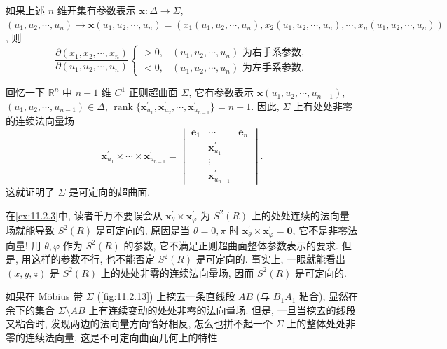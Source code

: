 如果上述 $n$ 维开集有参数表示 $\boldsymbol{x}: \Delta \to \Sigma$, $\left(u_{1}, u_{2}, \cdots, u_{n}\right) \to \boldsymbol{x}\left(u_{1}, u_{2}, \cdots, u_{n}\right)=\left(x_{1}\left(u_{1}, u_{2}, \cdots, u_{n}\right), x_{2}\left(u_{1}, u_{2}, \cdots, u_{n}\right), \cdots, x_{n}\left(u_{1}, u_{2}, \cdots, u_{n}\right)\right)$, 则
\[
  \frac{\partial\left(x_{1}, x_{2}, \cdots, x_{n}\right)}{\partial\left(u_{1}, u_{2}, \cdots, u_{n}\right)}
  \begin{cases}
    >0, & \left(u_{1}, u_{2}, \cdots, u_{n}\right) \text{ 为右手系参数}, \\
    <0, & \left(u_{1}, u_{2}, \cdots, u_{n}\right) \text{ 为左手系参数}.
  \end{cases}
\]

回忆一下 $\mathbb{R}^{n}$ 中 $n-1$ 维 $C^{1}$ 正则超曲面 $\Sigma$, 它有参数表示 $\boldsymbol{x}(u_{1}, \allowbreak u_{2}, \allowbreak \cdots, \allowbreak u_{n-1})$, $(u_{1}, \allowbreak u_{2}, \allowbreak \cdots, \allowbreak u_{n-1}) \in \Delta$, $\operatorname{rank}\{\boldsymbol{x}_{u_{1}}^{\prime}, \allowbreak \boldsymbol{x}_{u_{2}}^{\prime}, \allowbreak \cdots, \allowbreak \boldsymbol{x}_{u_{n-1}}^{\prime}\}=n-1$. 因此, $\Sigma$ 上有处处非零的连续法向量场
\[
  \boldsymbol{x}_{u_{1}}^{\prime} \times \cdots \times \boldsymbol{x}_{u_{n-1}}^{\prime}
  =\begin{vmatrix}
     \boldsymbol{e}_{1} & \cdots & \boldsymbol{e}_{n} \\
     & \boldsymbol{x}_{u_{1}}^{\prime} & \\
     & \vdots & \\
     & \boldsymbol{x}_{u_{n-1}}^{\prime} &
   \end{vmatrix}.
\]
这就证明了 $\Sigma$ 是可定向的超曲面.

\begin{remark}\label{rem:11.2.1}
在\cref{ex:11.2.3}中, 读者千万不要误会从 $\boldsymbol{x}_{\theta}^{\prime} \times \boldsymbol{x}_{\varphi}^{\prime}$ 为 $S^{2}(R)$ 上的处处连续的法向量场就能导致 $S^{2}(R)$ 是可定向的, 原因是当 $\theta=0, \pi$ 时 $\boldsymbol{x}_{\theta}^{\prime} \times \boldsymbol{x}_{\varphi}^{\prime}=\boldsymbol{0}$, 它不是非零法向量! 用 $\theta, \varphi$ 作为 $S^{2}(R)$ 的参数, 它不满足正则超曲面整体参数表示的要求. 但是, 用这样的参数不行, 也不能否定 $S^{2}(R)$ 是可定向的. 事实上, 一眼就能看出 $(x, y, z)$ 是 $S^{2}(R)$ 上的处处非零的连续法向量场, 因而 $S^{2}(R)$ 是可定向的.

如果在 Möbius 带 $\Sigma$ (\cref{fig:11.2.13}) 上挖去一条直线段 $AB$ (与 $B_{1}A_{1}$ 粘合), 显然在余下的集合 $\Sigma \setminus AB$ 上有连续变动的处处非零的法向量场. 但是, 一旦当挖去的线段又粘合时, 发现两边的法向量方向恰好相反, 怎么也拼不起一个 $\Sigma$ 上的整体处处非零的连续法向量. 这是不可定向曲面几何上的特性.
\end{remark}

